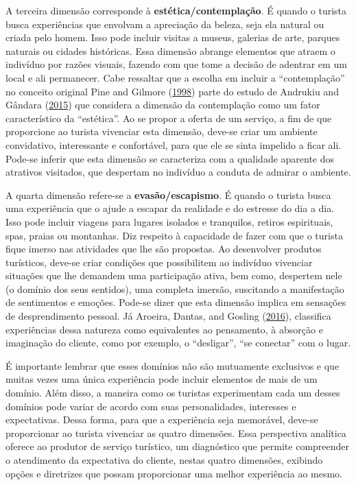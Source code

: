 \documentclass[preprint, 3p,
authoryear]{elsarticle} %
\begin{document}
A terceira dimensão corresponde à \textbf{estética/contemplação}. É
quando o turista busca experiências que envolvam a apreciação da beleza,
seja ela natural ou criada pelo homem. Isso pode incluir visitas a
museus, galerias de arte, parques naturais ou cidades históricas. Essa
dimensão abrange elementos que atraem o indivíduo por razões visuais,
fazendo com que tome a decisão de adentrar em um local e ali permanecer.
Cabe ressaltar que a escolha em incluir a ``contemplação'' no conceito
original Pine and Gilmore (\protect\hyperlink{ref-pine1999}{1998}) parte
do estudo de Andrukiu and Gândara
(\protect\hyperlink{ref-Andrukiu2015}{2015}) que considera a dimensão da
contemplação como um fator característico da ``estética''. Ao se propor
a oferta de um serviço, a fim de que proporcione ao turista vivenciar
esta dimensão, deve-se criar um ambiente convidativo, interessante e
confortável, para que ele se sinta impelido a ficar ali. Pode-se inferir
que esta dimensão se caracteriza com a qualidade aparente dos atrativos
visitados, que despertam no indivíduo a conduta de admirar o ambiente.

A quarta dimensão refere-se a \textbf{evasão/escapismo}. É quando o
turista busca uma experiência que o ajude a escapar da realidade e do
estresse do dia a dia. Isso pode incluir viagens para lugares isolados e
tranquilos, retiros espirituais, spas, praias ou montanhas. Diz respeito
à capacidade de fazer com que o turista fique imerso nas atividades que
lhe são propostas. Ao desenvolver produtos turísticos, deve-se criar
condições que possibilitem ao indivíduo vivenciar situações que lhe
demandem uma participação ativa, bem como, despertem nele (o domínio dos
seus sentidos), uma completa imersão, suscitando a manifestação de
sentimentos e emoções. Pode-se dizer que esta dimensão implica em
sensações de desprendimento pessoal. Já Aroeira, Dantas, and Gosling
(\protect\hyperlink{ref-Aroeira2016}{2016}), classifica experiências
dessa natureza como equivalentes ao pensamento, à absorção e imaginação
do cliente, como por exemplo, o ``desligar'', ``se conectar'' com o
lugar.

É importante lembrar que esses domínios não são mutuamente exclusivos e
que muitas vezes uma única experiência pode incluir elementos de mais de
um domínio. Além disso, a maneira como os turistas experimentam cada um
desses domínios pode variar de acordo com suas personalidades,
interesses e expectativas. Dessa forma, para que a experiência seja
memorável, deve-se proporcionar ao turista vivenciar as quatro
dimensões. Essa perspectiva analítica oferece ao produtor de serviço
turístico, um diagnóstico que permite compreender o atendimento da
expectativa do cliente, nestas quatro dimensões, exibindo opções e
diretrizes que possam proporcionar uma melhor experiência ao mesmo.
\end{document}
